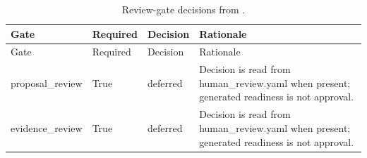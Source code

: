 \documentclass[
]{article}
\begin{document}
\begin{longtable}[]{@{}
  >{\raggedright\arraybackslash}p{}
  >{\raggedright\arraybackslash}p{}
  >{\raggedright\arraybackslash}p{}
  >{\raggedright\arraybackslash}p{}@{}}
\caption{Review-gate decisions from
\protect{}.}\label{tbl:review-gates}\tabularnewline
\toprule\noalign{}
\begin{minipage}[b]{\linewidth}\raggedright
Gate
\end{minipage} & \begin{minipage}[b]{\linewidth}\raggedright
Required
\end{minipage} & \begin{minipage}[b]{\linewidth}\raggedright
Decision
\end{minipage} & \begin{minipage}[b]{\linewidth}\raggedright
Rationale
\end{minipage} \\
\midrule\noalign{}
\endfirsthead
\toprule\noalign{}
\begin{minipage}[b]{\linewidth}\raggedright
Gate
\end{minipage} & \begin{minipage}[b]{\linewidth}\raggedright
Required
\end{minipage} & \begin{minipage}[b]{\linewidth}\raggedright
Decision
\end{minipage} & \begin{minipage}[b]{\linewidth}\raggedright
Rationale
\end{minipage} \\
\midrule\noalign{}
\endhead
\bottomrule\noalign{}
\endlastfoot
proposal\_review & True & deferred & Decision is read from
human\_review.yaml when present; generated readiness is not approval. \\
evidence\_review & True & deferred & Decision is read from
human\_review.yaml when present; generated readiness is not approval. \\
\end{longtable}
\end{document}
